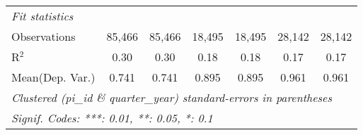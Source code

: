 \begin{tabular}{lcccccc}
   \midrule
   \emph{Fit statistics}\\
   Observations                                                & 85,466        & 85,466        & 18,495       & 18,495        & 28,142         & 28,142\\  
   R$^2$                                                       & 0.30          & 0.30          & 0.18         & 0.18          & 0.17           & 0.17\\  
Mean(Dep. Var.) & 0.741 & 0.741 & 0.895 & 0.895 & 0.961 & 0.961 \\
   \midrule \midrule
   \multicolumn{7}{l}{\emph{Clustered (pi\_id \& quarter\_year) standard-errors in parentheses}}\\
   \multicolumn{7}{l}{\emph{Signif. Codes: ***: 0.01, **: 0.05, *: 0.1}}\\
\end{tabular}
\par\endgroup
